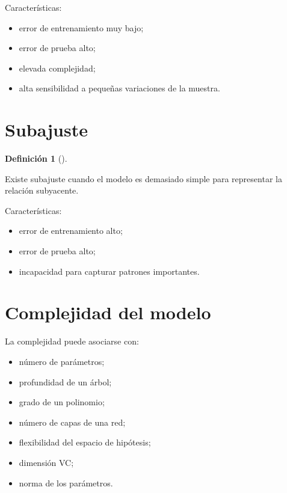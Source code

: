 \documentclass[
  spanish,
  11pt,
  letterpaper,
  DIV=11,
  numbers=noendperiod]{scrreprt}
\providecommand{\tightlist}{%
  \setlength{\itemsep}{0pt}\setlength{\parskip}{0pt}}
\theoremstyle{definition}
\newtheorem{definition}{Definición}[chapter]
\theoremstyle{plain}
\theoremstyle{definition}
\theoremstyle{remark}
\begin{document}
Características:

\begin{itemize}
\tightlist
\item
  error de entrenamiento muy bajo;
\item
  error de prueba alto;
\item
  elevada complejidad;
\item
  alta sensibilidad a pequeñas variaciones de la muestra.
\end{itemize}

\section{Subajuste}\label{subajuste}

\begin{definition}[]\protect\hypertarget{def-subajuste}{}\label{def-subajuste}

Existe subajuste cuando el modelo es demasiado simple para representar
la relación subyacente.

\end{definition}

Características:

\begin{itemize}
\tightlist
\item
  error de entrenamiento alto;
\item
  error de prueba alto;
\item
  incapacidad para capturar patrones importantes.
\end{itemize}

\section{Complejidad del modelo}\label{complejidad-del-modelo}

La complejidad puede asociarse con:

\begin{itemize}
\tightlist
\item
  número de parámetros;
\item
  profundidad de un árbol;
\item
  grado de un polinomio;
\item
  número de capas de una red;
\item
  flexibilidad del espacio de hipótesis;
\item
  dimensión VC;
\item
  norma de los parámetros.
\end{itemize}
\end{document}
